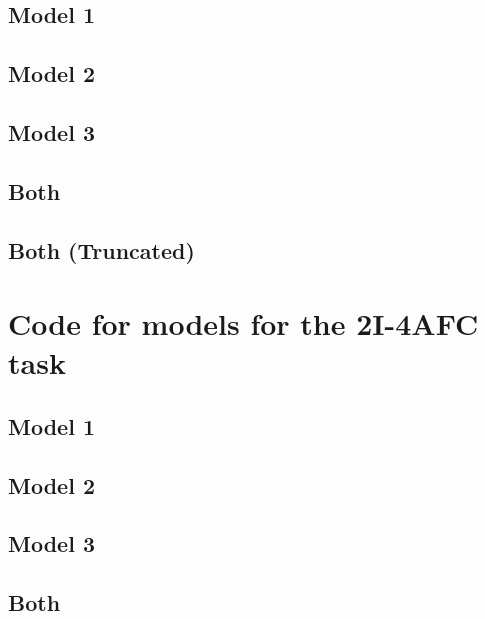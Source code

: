 \documentclass{article}\usepackage{knitr}
\begin{document}
\subsection{Model 1}


\subsection{Model 2}


\subsection{Model 3}


\subsection{Both}


\subsection{Both (Truncated)}


\newpage
\section{Code for models for the 2I-4AFC task}

\subsection{Model 1}


\subsection{Model 2}


\subsection{Model 3}


\subsection{Both}

\end{document}

